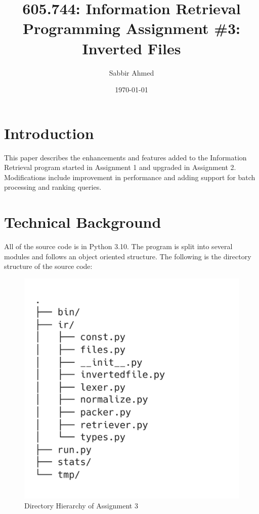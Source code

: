 \documentclass[11pt]{article}
\title{605.744: Information Retrieval \\ Programming Assignment \#3: Inverted Files}
\author{Sabbir Ahmed}
\date{\today}
\begin{document}
\maketitle	
\tableofcontents
\clearpage
\newpage

\section{Introduction}
This paper describes the enhancements and features added to the Information Retrieval program started in Assignment 1 and upgraded in Assignment 2. Modifications include improvement in performance and adding support for batch processing and ranking queries.

\section{Technical Background}
All of the source code is in Python 3.10. The program is split into several modules and follows an object oriented structure. The following is the directory structure of the source code:


\begin{figure}[!ht]
    \centering
    \includegraphics[scale=0.2]{statics/dirtree.png}
    \caption{Directory Hierarchy of Assignment 3}
\end{figure}
\end{document}

